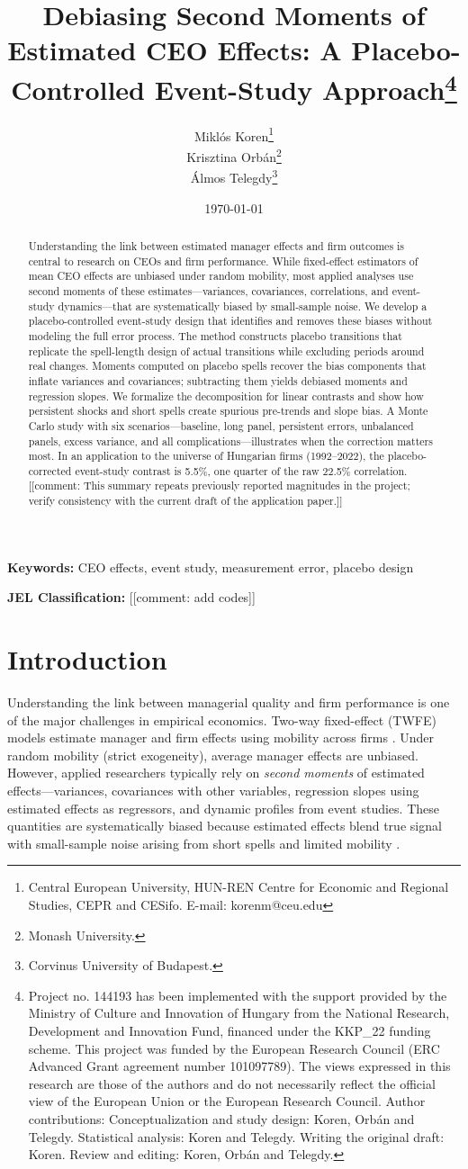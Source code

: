 \documentclass[11pt,a4paper]{article}
\title{Debiasing Second Moments of Estimated CEO Effects: A Placebo-Controlled Event-Study Approach\thanks{Project no. 144193 has been implemented with the support provided by the Ministry of Culture and Innovation of Hungary from the National Research, Development and Innovation Fund, financed under the KKP\_22 funding scheme. This project was funded by the European Research Council (ERC Advanced Grant agreement number 101097789). The views expressed in this research are those of the authors and do not necessarily reflect the official view of the European Union or the European Research Council. Author contributions: Conceptualization and study design: Koren, Orbán and Telegdy. Statistical analysis: Koren and Telegdy. Writing the original draft: Koren. Review and editing: Koren, Orbán and Telegdy.}}
\author{Miklós Koren\thanks{Central European University, HUN-REN Centre for Economic and Regional Studies, CEPR and CESifo. E-mail: korenm@ceu.edu} \\
        Krisztina Orbán\thanks{Monash University.} \\
        Álmos Telegdy\thanks{Corvinus University of Budapest.}}
\date{\today}
\begin{document}
\maketitle

\begin{abstract}
Understanding the link between estimated manager effects and firm outcomes is central to research on CEOs and firm performance. While fixed-effect estimators of mean CEO effects are unbiased under random mobility, most applied analyses use second moments of these estimates—variances, covariances, correlations, and event-study dynamics—that are systematically biased by small-sample noise. We develop a placebo-controlled event-study design that identifies and removes these biases without modeling the full error process. The method constructs placebo transitions that replicate the spell-length design of actual transitions while excluding periods around real changes. Moments computed on placebo spells recover the bias components that inflate variances and covariances; subtracting them yields debiased moments and regression slopes. We formalize the decomposition for linear contrasts and show how persistent shocks and short spells create spurious pre-trends and slope bias. A Monte Carlo study with six scenarios—baseline, long panel, persistent errors, unbalanced panels, excess variance, and all complications—illustrates when the correction matters most. In an application to the universe of Hungarian firms (1992--2022), the placebo-corrected event-study contrast is 5.5\%, one quarter of the raw 22.5\% correlation. [[comment: This summary repeats previously reported magnitudes in the project; verify consistency with the current draft of the application paper.]]
\end{abstract}

\textbf{Keywords:} CEO effects, event study, measurement error, placebo design

\textbf{JEL Classification:} [[comment: add codes]]

\newpage

\section{Introduction}

Understanding the link between managerial quality and firm performance is one of the major challenges in empirical economics. Two-way fixed-effect (TWFE) models estimate manager and firm effects using mobility across firms \citep{Abowd1999Econometrica,Card2018JoLE}. Under random mobility (strict exogeneity), average manager effects are unbiased. However, applied researchers typically rely on \emph{second moments} of estimated effects—variances, covariances with other variables, regression slopes using estimated effects as regressors, and dynamic profiles from event studies. These quantities are systematically biased because estimated effects blend true signal with small-sample noise arising from short spells and limited mobility \citep{andrews2008high,gaure2014correlation,Bonhomme2023-dx}.
\end{document}
